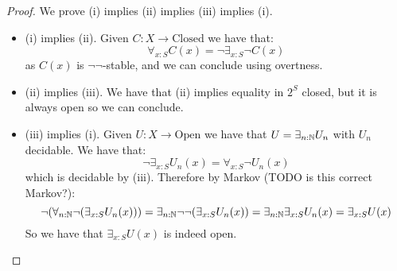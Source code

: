 \begin{proof}
We prove (i) implies (ii) implies (iii) implies (i).
\begin{itemize}
\item (i) implies (ii). Given $C:X\to \mathrm{Closed}$ we have that:
\[\forall_{x:S} C(x) = \neg \exists_{x:S} \neg C(x)\]
as $C(x)$ is $\neg\neg$-stable, and we can conclude using overtness.
\item (ii) implies (iii). We have that (ii) implies equality in $2^S$ closed, but it is always open so we can conclude.
\item (iii) implies (i). Given $U:X\to \mathrm{Open}$ we have that $U = \exists_{n:\mathbb{N}} U_n$ with $U_n$ decidable. We have that:
\[\neg \exists_{x:S} U_n(x) = \forall_{x:S} \neg U_n(x)\]
which is decidable by (iii). Therefore by Markov (TODO is this correct Markov?):
\[\neg(\forall_{n:\mathbb{N}} \neg (\exists_{x:S} U_n(x))) =  \exists_{n:\mathbb{N}} \neg\neg (\exists_{x:S} U_n(x)) =  \exists_{n:\mathbb{N}} \exists_{x:S} U_n(x) = \exists_{x:S}U(x)\]
So we have that $\exists_{x:S}U(x)$ is indeed open.
\end{itemize}
\end{proof}
